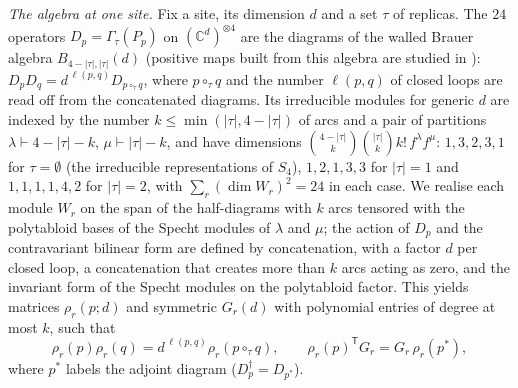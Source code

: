 \documentclass[aps,pra,twocolumn,superscriptaddress,nofootinbib,longbibliography]{revtex4-2}
\newcommand{\C}{\mathbb C}
\newcommand{\T}{\mathsf T}
\theoremstyle{plain}
\theoremstyle{definition}
\theoremstyle{remark}
\begin{document}
\emph{The algebra at one site.} Fix a site, its dimension $d$ and a set $\tau$ of replicas. The $24$ operators $D_p=\Gamma_\tau(P_p)$ on $(\C^d)^{\otimes4}$ are the diagrams of the walled Brauer algebra $B_{4-|\tau|,|\tau|}(d)$ \cite{Turaev,KoikeWB,BCHLLS} (positive maps built from this algebra are studied in \cite{BSH}): $D_pD_q=d^{\,\ell(p,q)}D_{p\circ_\tau q}$, where $p\circ_\tau q$ and the number $\ell(p,q)$ of closed loops are read off from the concatenated diagrams. Its irreducible modules for generic $d$ \cite{CDDM} are indexed by the number $k\le\min(|\tau|,4-|\tau|)$ of arcs and a pair of partitions $\lambda\vdash4-|\tau|-k$, $\mu\vdash|\tau|-k$, and have dimensions $\binom{4-|\tau|}k\binom{|\tau|}kk!\,f^\lambda f^\mu$: $1,3,2,3,1$ for $\tau=\emptyset$ (the irreducible representations of $S_4$), $1,2,1,3,3$ for $|\tau|=1$ and $1,1,1,1,4,2$ for $|\tau|=2$, with $\sum_r(\dim W_r)^2=24$ in each case. We realise each module $W_r$ on the span of the half-diagrams with $k$ arcs tensored with the polytabloid bases of the Specht modules of $\lambda$ and $\mu$; the action of $D_p$ and the contravariant bilinear form are defined by concatenation, with a factor $d$ per closed loop, a concatenation that creates more than $k$ arcs acting as zero, and the invariant form of the Specht modules on the polytabloid factor. This yields matrices $\rho_r(p;d)$ and symmetric $G_r(d)$ with polynomial entries of degree at most $k$, such that
\begin{equation}\label{eq:blockrules}
\rho_r(p)\rho_r(q)=d^{\,\ell(p,q)}\rho_r(p\circ_\tau q),\qquad \rho_r(p)^\T G_r=G_r\,\rho_r(p^*),
\end{equation}
where $p^*$ labels the adjoint diagram ($D_p^\dagger=D_{p^*}$).
\end{document}
